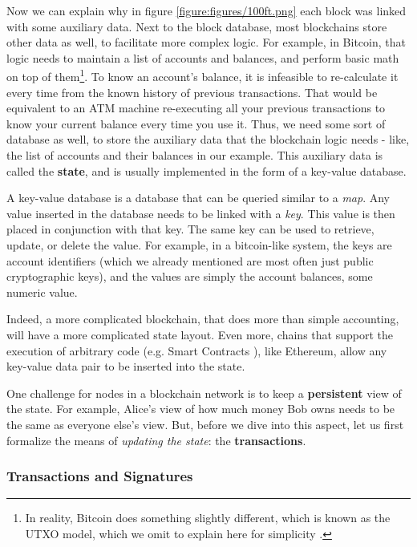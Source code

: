 Now we can explain why in figure \ref{figure:figures/100ft.png} each block was linked with some
auxiliary data. Next to the block database, most blockchains store other data as well, to facilitate
more complex logic. For example, in Bitcoin, that logic needs to maintain a list of accounts and
balances, and perform basic math on top of them\footnote{In reality, Bitcoin does something slightly
different, which is known as the UTXO model, which we omit to explain here for simplicity
\cite{delgado-seguraAnalysisBitcoinUTXO2017}.}. To know an account's balance, it is infeasible to
re-calculate it every time from the known history of previous transactions. That would be equivalent
to an ATM machine re-executing all your previous transactions to know your current balance every
time you use it. Thus, we need some sort of database as well, to store the auxiliary data that the
blockchain logic needs - like, the list of accounts and their balances in our example. This
auxiliary data is called the \textbf{state}, and is usually implemented in the form of a key-value
database.

A key-value database is a database that can be queried similar to a \textit{map}. Any value inserted
in the database needs to be linked with a \textit{key}. This value is then placed in conjunction
with that key. The same key can be used to retrieve, update, or delete the value. For example, in a
bitcoin-like system, the keys are account identifiers (which we already mentioned are most often
just public cryptographic keys), and the values are simply the account balances, some numeric value.

Indeed, a more complicated blockchain, that does more than simple accounting, will have a more
complicated state layout. Even more, chains that support the execution of arbitrary code (e.g. Smart
Contracts \cite{EthereumWhitepaper}), like Ethereum, allow any key-value data pair to be inserted
into the state.

One challenge for nodes in a blockchain network is to keep a \textbf{persistent} view of the state.
For example, Alice's view of how much money Bob owns needs to be the same as everyone else's view.
But, before we dive into this aspect, let us first formalize the means of \textit{updating the
state}: the \textbf{transactions}.

\subsubsection{Transactions and Signatures} \label{chap_bg:subsec:transaction_sig}

